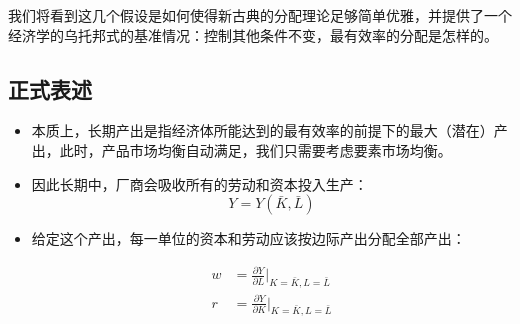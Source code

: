 \documentclass[
  11pt,
  letterpaper,
]{ctexbook}
\begin{document}
我们将看到这几个假设是如何使得新古典的分配理论足够简单优雅，并提供了一个经济学的乌托邦式的基准情况：控制其他条件不变，最有效率的分配是怎样的。

\subsection{正式表述}\label{ux6b63ux5f0fux8868ux8ff0}

\begin{itemize}
\item
  本质上，长期产出是指经济体所能达到的最有效率的前提下的最大（潜在）产出，此时，产品市场均衡自动满足，我们只需要考虑要素市场均衡。
\item
  因此长期中，厂商会吸收所有的劳动和资本投入生产： \[
  Y = Y(\bar{K},\bar{L})
  \]
\item
  给定这个产出，每一单位的资本和劳动应该按边际产出分配全部产出：

  \begin{align}
  w &= \frac{\partial Y}{\partial L}|_{K=\bar{K},L=\bar{L}} \\

  r &= \frac{\partial Y}{\partial K}|_{K=\bar{K},L=\bar{L}} \\
  \end{align}
\end{itemize}
\end{document}
